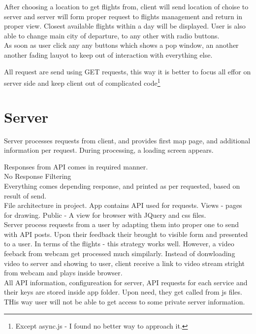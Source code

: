 \documentclass[12pt]{article}
\numberwithin{equation}{section} %
\numberwithin{figure}{section} %
\numberwithin{table}{section} %
\begin{document}
	After choosing a location to get flights from, client will send location of choise to server and server will form proper request to flights management and return in proper view. Closest available flights within a day will be displayed. User is also able to change main city of departure, to any other with radio buttons. \\
	
	As soon as user click any any buttons which shows a pop window, an another another fading lauyot to keep out of interaction with everything else.
	
	All request are send using GET requests, this way it is better to focus all effor on server side and keep client out of complicated code\footnote{Except async.js - I found no better way to approach it.}
\section{Server}
	Server processes requests from client, and provides first map page, and additional information per request. During processing, a loading screen appears.
	
	Responses from API comes in required manner. \\
    No Response Filtering \\
	Everything comes depending response, and printed as per requested, based on result of send. \\
	File architecture in project. App contains API used for requests. Views - pages for drawing. Public - A view for browser with JQuery and css files. \\
	
	Server process requests from a user by adapting them into proper one to send with API posts. Upon their feedback their brought to visible form and presented to a user. In terms of the flights - this strategy works well. However, a video feeback from webcam get processed much simpilarly. Instead of donwloading video to server and showing to user, client receive a link to video stream stright from webcam and plays inside browser. \\
	All API information, configureation for server, API requests for each service and their keys are stored inside app folder. Upon need, they get called from js files. THis way user will not be able to get access to some private server information.
\end{document}
